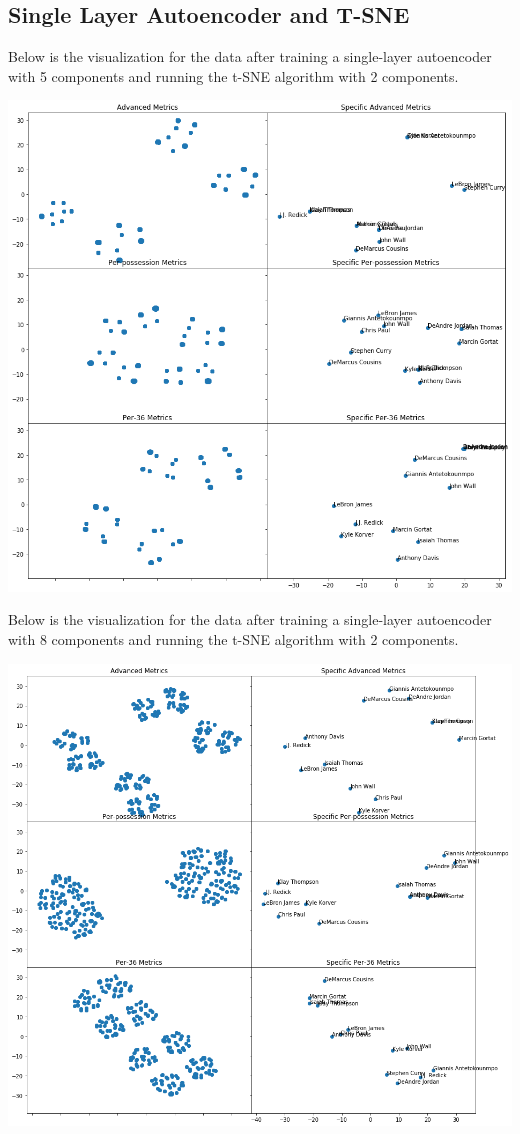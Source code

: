 \documentclass[12pt]{article}
\begin{document}
    \subsection{Single Layer Autoencoder and T-SNE}
    Below is the visualization for the data after training a single-layer autoencoder with 5 components and running the t-SNE algorithm with 2 components.
    \begin{center}
        \includegraphics[scale=0.5]{images/single-layer-5}
    \end{center}
    Below is the visualization for the data after training a single-layer autoencoder with 8 components and running the t-SNE algorithm with 2 components.
    \begin{center}
        \includegraphics[scale=0.5]{images/single-layer-8}
    \end{center}
\end{document}
